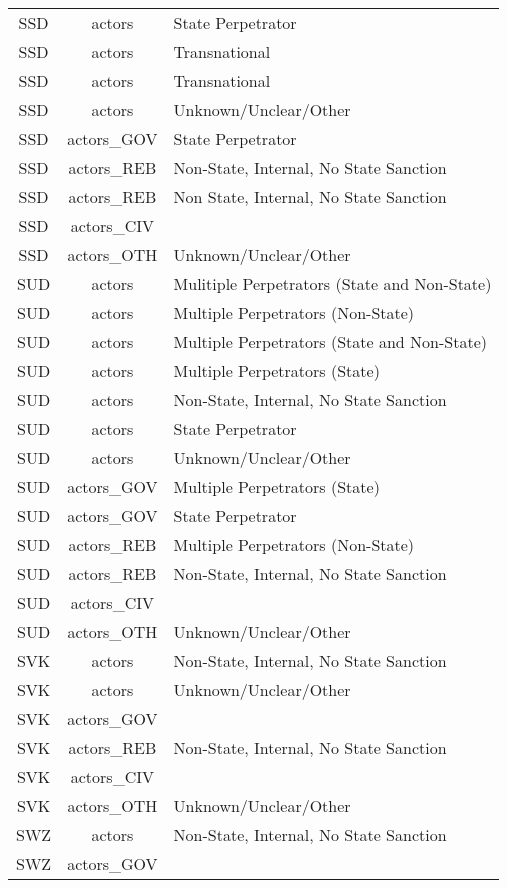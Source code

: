 \documentclass[12pt]{article}
\begin{document}
\begin{center}
\begin{longtable}{|c|c|p{10cm}|}
  SSD & actors & State Perpetrator \\ 
  SSD & actors & Transnational \\ 
  SSD & actors & Transnational \\ 
  SSD & actors & Unknown/Unclear/Other \\ 
  SSD & actors\_GOV & State Perpetrator \\ 
  SSD & actors\_REB & Non-State, Internal, No State Sanction \\ 
  SSD & actors\_REB & Non State, Internal, No State Sanction \\ 
  SSD & actors\_CIV &  \\ 
  SSD & actors\_OTH & Unknown/Unclear/Other \\ 
  SUD & actors & Mulitiple Perpetrators (State and Non-State) \\ 
  SUD & actors & Multiple Perpetrators (Non-State) \\ 
  SUD & actors & Multiple Perpetrators (State and Non-State) \\ 
  SUD & actors & Multiple Perpetrators (State) \\ 
  SUD & actors & Non-State, Internal, No State Sanction \\ 
  SUD & actors & State Perpetrator \\ 
  SUD & actors & Unknown/Unclear/Other \\ 
  SUD & actors\_GOV & Multiple Perpetrators (State) \\ 
  SUD & actors\_GOV & State Perpetrator \\ 
  SUD & actors\_REB & Multiple Perpetrators (Non-State) \\ 
  SUD & actors\_REB & Non-State, Internal, No State Sanction \\ 
  SUD & actors\_CIV &  \\ 
  SUD & actors\_OTH & Unknown/Unclear/Other \\ 
  SVK & actors & Non-State, Internal, No State Sanction \\ 
  SVK & actors & Unknown/Unclear/Other \\ 
  SVK & actors\_GOV &  \\ 
  SVK & actors\_REB & Non-State, Internal, No State Sanction \\ 
  SVK & actors\_CIV &  \\ 
  SVK & actors\_OTH & Unknown/Unclear/Other \\ 
  SWZ & actors & Non-State, Internal, No State Sanction \\ 
  SWZ & actors\_GOV &  \\ 

\end{longtable}
\end{center}
\end{document}
